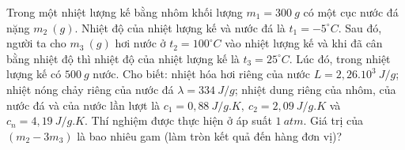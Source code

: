 \begin{vidu}
	Trong một nhiệt lượng kế bằng nhôm khối lượng $m_1=300\ g$ có một cục nước đá nặng $m_2\ (g)$. Nhiệt độ của nhiệt lượng kế và nước đá là $t_1=-5^\circ C$. Sau đó, người ta cho $m_3\ (g)$ hơi nước ở $t_2=100^\circ C$ vào nhiệt lượng kế và khi đã cân bằng nhiệt độ thì nhiệt độ của nhiệt lượng kế là $t_3=25^\circ C$. Lúc đó, trong nhiệt lượng kế có $500\ g$ nước. Cho biết: nhiệt hóa hơi riêng của nước $L=2,26.10^3\ J /g$; nhiệt nóng chảy riêng của nước đá $\lambda=334\ J /g$; nhiệt dung riêng của nhôm, của nước đá và của nước lần lượt là $c_1=0,88\ J / g.K,\ c_2=2,09\ J / g.K$ và $c_{n}=4,19\ J / g.K$. Thí nghiệm được thực hiện ở  áp suất $1\ atm$. Giá trị của $\left(m_2-3m_3\right)$ là bao nhiêu gam (làm tròn kết quả đến hàng đơn vị)?
	\end{vidu}
